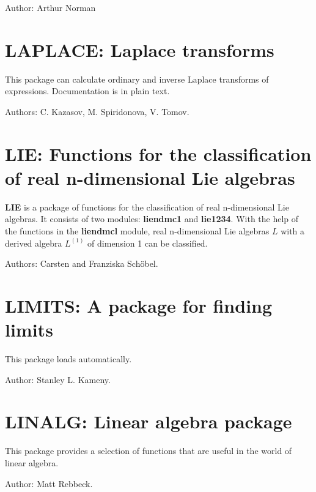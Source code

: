 Author: Arthur Norman


\newpage

\section{LAPLACE: Laplace transforms} 

This package can calculate ordinary and inverse Laplace transforms of
expressions.  Documentation is in plain text.

Authors: C. Kazasov, M. Spiridonova, V. Tomov.


\newpage

\section{LIE: Functions for the classification of real n-dimensional Lie
algebras}

{\bf LIE} is a package of functions for the classification of real
n-dimensional Lie algebras.  It consists of two modules: {\bf liendmc1}
and {\bf lie1234}.  With the help of the functions in the {\bf liendmcl}
module, real n-dimensional Lie algebras $L$ with a derived algebra
$L^{(1)}$ of dimension 1 can be classified.

Authors: Carsten and Franziska Sch\"obel.


\newpage

\section{LIMITS: A package for finding limits} 


This package loads automatically.

Author: Stanley L. Kameny.


\newpage

\section{LINALG: Linear algebra package} 
\label{LINALG}

This package provides a selection of functions that are useful 
in the world of linear algebra.

Author: Matt Rebbeck.

